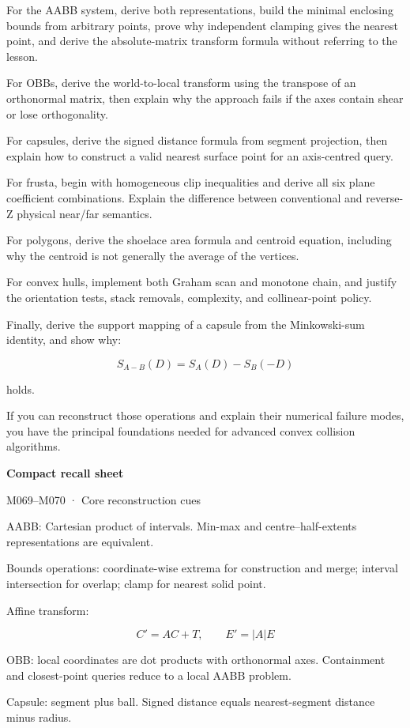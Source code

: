 For the AABB system, derive both representations, build the minimal enclosing bounds from arbitrary points, prove why independent clamping gives the nearest point, and derive the absolute-matrix transform formula without referring to the lesson.

For OBBs, derive the world-to-local transform using the transpose of an orthonormal matrix, then explain why the approach fails if the axes contain shear or lose orthogonality.

For capsules, derive the signed distance formula from segment projection, then explain how to construct a valid nearest surface point for an axis-centred query.

For frusta, begin with homogeneous clip inequalities and derive all six plane coefficient combinations. Explain the difference between conventional and reverse-Z physical near/far semantics.

For polygons, derive the shoelace area formula and centroid equation, including why the centroid is not generally the average of the vertices.

For convex hulls, implement both Graham scan and monotone chain, and justify the orientation tests, stack removals, complexity, and collinear-point policy.

Finally, derive the support mapping of a capsule from the Minkowski-sum identity, and show why:

\[
S_{A-B}(D)=S_A(D)-S_B(-D)
\]

holds.

If you can reconstruct those operations and explain their numerical failure modes, you have the principal foundations needed for advanced convex collision algorithms.

\textbf{Compact recall sheet}

M069--M070 · Core reconstruction cues

AABB: Cartesian product of intervals. Min-max and centre--half-extents representations are equivalent.

Bounds operations: coordinate-wise extrema for construction and merge; interval intersection for overlap; clamp for nearest solid point.

Affine transform:

\[
\boxed{C'=AC+T,\qquad E'=|A|E}
\]

OBB: local coordinates are dot products with orthonormal axes. Containment and closest-point queries reduce to a local AABB problem.

Capsule: segment plus ball. Signed distance equals nearest-segment distance minus radius.

